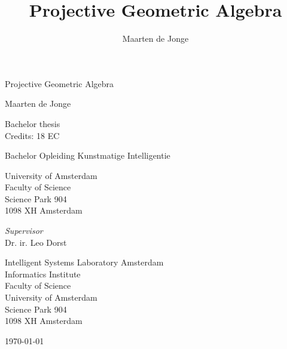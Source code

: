 \documentclass[a4paper, 10pt]{article}
\author{Maarten de Jonge}
\title{Projective Geometric Algebra}
\begin{document}
\newcommand{\rp}{$\mathbb{R}^{3,3}$ }

\begin{center}

\vspace{2.5cm}

\begin{Huge}
Projective Geometric Algebra
\end{Huge}

\vspace{1.5cm}

Maarten de Jonge \\

\vspace{1.5cm}

Bachelor thesis\\
Credits: 18 EC

\vspace{0.5cm}

Bachelor Opleiding Kunstmatige Intelligentie

\vspace{0.25cm}

University of Amsterdam\\
Faculty of Science\\
Science Park 904\\
1098 XH Amsterdam

\vspace{4cm}

\emph{Supervisor}\\
Dr. ir. Leo Dorst

\vspace{0.25cm}

Intelligent Systems Laboratory Amsterdam \\
Informatics Institute \\
Faculty of Science\\
University of Amsterdam\\
Science Park 904\\
1098 XH  Amsterdam

\vspace{1.5cm}

\today

\end{center}
\clearpage
\end{document}
